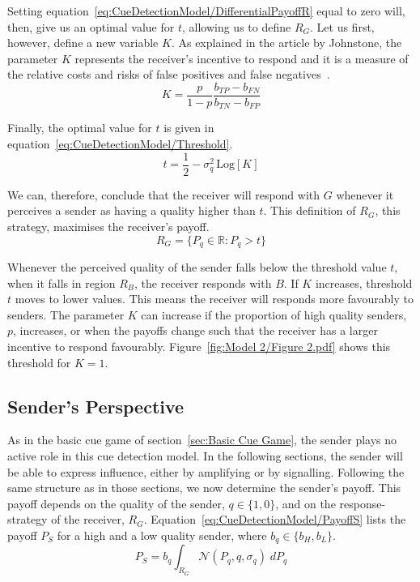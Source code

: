 \documentclass[a4paper,12pt]{article}
\numberwithin{equation}{section}
\begin{document}
Setting equation~\ref{eq:CueDetectionModel/DifferentialPayoffR} equal to zero will, then, give us an optimal value for $t$, allowing us to define $R_{G}$. Let us first, however, define a new variable $K$. As explained in the article by Johnstone, the parameter $K$ represents the receiver's incentive to respond and it is a measure of the relative costs and risks of false positives and false negatives~\cite{Johnstone1997}.
\begin{equation}
\label{eq:K}
K=\frac{p}{1-p}\frac{b_{TP}-b_{FN}}{b_{TN}-b_{FP}}
\end{equation}

Finally, the optimal value for $t$ is given in equation~\ref{eq:CueDetectionModel/Threshold}.
\begin{equation}
\label{eq:CueDetectionModel/Threshold}
t=\frac{1}{2}-\sigma_{q}^2 \, \text{Log}[K]
\end{equation}

We can, therefore, conclude that the receiver will respond with $G$ whenever it perceives a sender as having a quality higher than $t$. This definition of $R_{G}$, this strategy, maximises the receiver's payoff.
\begin{equation}
\label{eq:RG}
R_{G} = \{P_{q} \in \mathbb{R} : P_{q}>t\}
\end{equation}

Whenever the perceived quality of the sender falls below the threshold value $t$, when it falls in region $R_{B}$, the receiver responds with $B$. If $K$ increases, threshold $t$ moves to lower values. This means the receiver will responds more favourably to senders. The parameter $K$ can increase if the proportion of high quality senders, $p$, increases, or when the payoffs change such that the receiver has a larger incentive to respond favourably. Figure~\ref{fig:Model 2/Figure 2.pdf} shows this threshold for $K=1$.


\subsection{Sender's Perspective}
\label{sec:CueDetectionModel/Sender's Perspective}

As in the basic cue game of section~\ref{sec:Basic Cue Game}, the sender plays no active role in this cue detection model. In the following sections, the sender will be able to express influence, either by amplifying or by signalling. Following the same structure as in those sections, we now determine the sender's payoff. This payoff depends on the quality of the sender, $q \in \{1, 0\}$, and on the response-strategy of the receiver, $R_{G}$. Equation~\ref{eq:CueDetectionModel/PayoffS} lists the payoff $P_{S}$ for a high and a low quality sender, where $b_{q} \in \{b_{H}, b_{L}\}$.
\begin{equation}
\label{eq:CueDetectionModel/PayoffS}
P_{S} = b_{q} \displaystyle \int_{R_{G}} \mathcal{N}(P_{q}, q, \sigma_{q}) \; dP_{q}
\end{equation}
\end{document}
